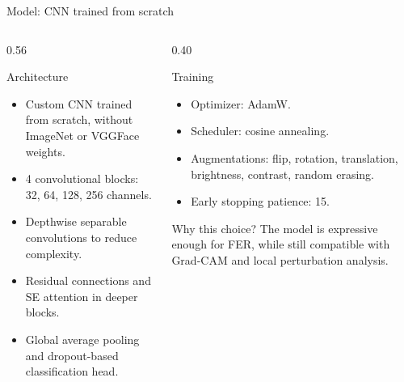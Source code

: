 \documentclass[aspectratio=169,10pt]{beamer}
\begin{document}
\begin{frame}{Model: CNN trained from scratch}
  \begin{columns}[T,totalwidth=\textwidth]
    \begin{column}{0.56\textwidth}
      \begin{block}{Architecture}
        \begin{itemize}
          \item Custom CNN trained from scratch, without ImageNet or VGGFace weights.
          \item 4 convolutional blocks: 32, 64, 128, 256 channels.
          \item Depthwise separable convolutions to reduce complexity.
          \item Residual connections and SE attention in deeper blocks.
          \item Global average pooling and dropout-based classification head.
        \end{itemize}
      \end{block}
    \end{column}
    \begin{column}{0.40\textwidth}
      \begin{block}{Training}
        \begin{itemize}
          \item Optimizer: AdamW.
          \item Scheduler: cosine annealing.
          \item Augmentations: flip, rotation, translation, brightness, contrast, random erasing.
          \item Early stopping patience: 15.
        \end{itemize}
      \end{block}
      \begin{block}{Why this choice?}
        The model is expressive enough for FER, while still compatible with Grad-CAM and local perturbation analysis.
      \end{block}
    \end{column}
  \end{columns}
\end{frame}
\end{document}

